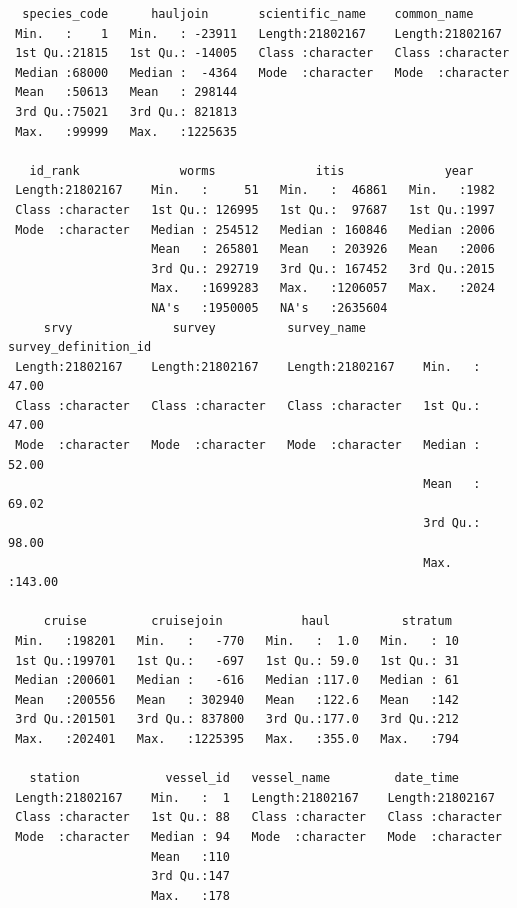 \documentclass[
  letterpaper,
  oneside,
  open=any]{scrbook}
\begin{document}
\begin{verbatim}
  species_code      hauljoin       scientific_name    common_name       
 Min.   :    1   Min.   : -23911   Length:21802167    Length:21802167   
 1st Qu.:21815   1st Qu.: -14005   Class :character   Class :character  
 Median :68000   Median :  -4364   Mode  :character   Mode  :character  
 Mean   :50613   Mean   : 298144                                        
 3rd Qu.:75021   3rd Qu.: 821813                                        
 Max.   :99999   Max.   :1225635                                        
                                                                        
   id_rank              worms              itis              year     
 Length:21802167    Min.   :     51   Min.   :  46861   Min.   :1982  
 Class :character   1st Qu.: 126995   1st Qu.:  97687   1st Qu.:1997  
 Mode  :character   Median : 254512   Median : 160846   Median :2006  
                    Mean   : 265801   Mean   : 203926   Mean   :2006  
                    3rd Qu.: 292719   3rd Qu.: 167452   3rd Qu.:2015  
                    Max.   :1699283   Max.   :1206057   Max.   :2024  
                    NA's   :1950005   NA's   :2635604                 
     srvy              survey          survey_name        survey_definition_id
 Length:21802167    Length:21802167    Length:21802167    Min.   : 47.00      
 Class :character   Class :character   Class :character   1st Qu.: 47.00      
 Mode  :character   Mode  :character   Mode  :character   Median : 52.00      
                                                          Mean   : 69.02      
                                                          3rd Qu.: 98.00      
                                                          Max.   :143.00      
                                                                              
     cruise         cruisejoin           haul          stratum   
 Min.   :198201   Min.   :   -770   Min.   :  1.0   Min.   : 10  
 1st Qu.:199701   1st Qu.:   -697   1st Qu.: 59.0   1st Qu.: 31  
 Median :200601   Median :   -616   Median :117.0   Median : 61  
 Mean   :200556   Mean   : 302940   Mean   :122.6   Mean   :142  
 3rd Qu.:201501   3rd Qu.: 837800   3rd Qu.:177.0   3rd Qu.:212  
 Max.   :202401   Max.   :1225395   Max.   :355.0   Max.   :794  
                                                                 
   station            vessel_id   vessel_name         date_time        
 Length:21802167    Min.   :  1   Length:21802167    Length:21802167   
 Class :character   1st Qu.: 88   Class :character   Class :character  
 Mode  :character   Median : 94   Mode  :character   Mode  :character  
                    Mean   :110                                        
                    3rd Qu.:147                                        
                    Max.   :178                                        
                                                                       

\end{verbatim}
\end{document}
